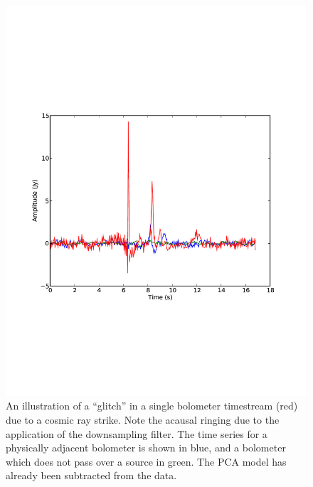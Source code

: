 \documentclass[12pt,preprint]{aastex}
\begin{document}
\begin{figure}
  \begin{minipage}{6.5in}
    \begin{center}
      \includegraphics[scale=0.5]{flagger_plots}
      \caption{An illustration of a ``glitch'' in a single bolometer
timestream (red) due to a cosmic ray strike.  Note the acausal ringing
due to the application of the downsampling filter.  The time series
for a physically adjacent bolometer is shown in blue, and a bolometer
which does not pass over a source in green.  The PCA model has already
been subtracted from the data.}
    \end{center}
  \end{minipage}

\end{figure}


\renewcommand{\thefigure}{\arabic{figure}}
\end{document}
